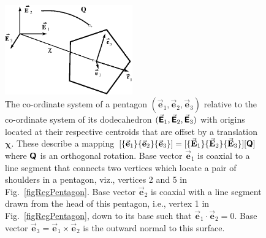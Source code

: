 \begin{figure}
    \centering
    \includegraphics[width=5.5cm]{figures/pentagonCoord.png}
    \caption{The co-ordinate system of a pentagon $( \vec{\mathbf{e}}_1 , \vec{\mathbf{e}}_2 , \vec{\mathbf{e}}_3 )$ relative to the co-ordinate system of its dodecahedron $( \vec{\boldsymbol{\mathsf{E}}}_1 , \vec{\boldsymbol{\mathsf{E}}}_2 , \vec{\boldsymbol{\mathsf{E}}}_3 )$ with origins located at their respective centroids that are offset by a translation $\boldsymbol{\chi}$.  These describe a mapping $[ \{ \vec{\mathbf{e}}_1 \} \{ \vec{\mathbf{e}}_2 \} \{ \vec{\mathbf{e}}_3 \} ] = [ \{ \vec{\mathbf{E}}_1 \} \{ \vec{\mathbf{E}}_2 \} \{ \vec{\mathbf{E}}_3 \} ] [ \boldsymbol{\mathsf{Q}} ]$ where $\boldsymbol{\mathsf{Q}}$ is an orthogonal rotation.  Base vector $\vec{\mathbf{e}}_1$ is coaxial to a line segment that connects two vertices which locate a pair of shoulders in a pentagon, viz., vertices 2 and 5 in Fig.~\ref{figRegPentagon}.  Base vector $\vec{\mathbf{e}}_2$ is coaxial with a line segment drawn from the head of this pentagon, i.e., vertex 1 in Fig.~\ref{figRegPentagon}, down to its base such that $\vec{\mathbf{e}}_1 \cdot \vec{\mathbf{e}}_2 = 0$.  Base vector $\vec{\mathbf{e}}_3 = \vec{\mathbf{e}}_1 \times \vec{\mathbf{e}}_2$ is the outward normal to this surface.}
    \label{figPentagonCoord}
\end{figure}


